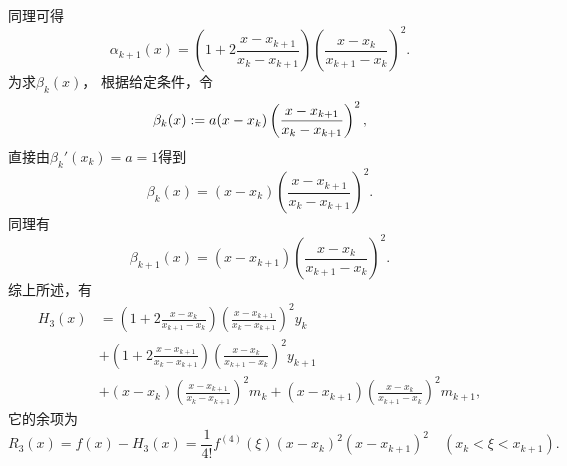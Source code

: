 同理可得\begin{equation*}
	\alpha_{k+1}(x)
	= \left( 1 + 2 \frac{x - x_{k+1}}{x_k - x_{k+1}} \right)
	\left( \frac{x - x_k}{x_{k+1} - x_k} \right)^2.
\end{equation*}
为求\(\beta_k(x)\)，
根据给定条件，令\begin{equation*}
	\beta_k(x)
	:=
	a (x-x_k)
	\left( \frac{x - x_{k+1}}{x_k - x_{k+1}} \right)^2,
\end{equation*}
直接由\(\beta_k'(x_k) = a = 1\)得到\begin{equation*}
	\beta_k(x)
	= (x-x_k)
	\left( \frac{x - x_{k+1}}{x_k - x_{k+1}} \right)^2.
\end{equation*}
同理有\begin{equation*}
	\beta_{k+1}(x)
	= (x-x_{k+1})
	\left( \frac{x - x_k}{x_{k+1} - x_k} \right)^2.
\end{equation*}
综上所述，有\begin{equation}\label{equation:厄米插值.两点三次厄米插值多项式}
	\begin{aligned}
		H_3(x)
		&= \left( 1 + 2 \frac{x - x_k}{x_{k+1} - x_k} \right)
		\left( \frac{x - x_{k+1}}{x_k - x_{k+1}} \right)^2
		y_k \\
		&+ \left( 1 + 2 \frac{x - x_{k+1}}{x_k - x_{k+1}} \right)
		\left( \frac{x - x_k}{x_{k+1} - x_k} \right)^2
		y_{k+1} \\
		&+ (x - x_k)
		\left( \frac{x - x_{k+1}}{x_k - x_{k+1}} \right)^2
		m_k
		+ (x - x_{k+1})
		\left( \frac{x - x_k}{x_{k+1} - x_k} \right)^2
		m_{k+1},
	\end{aligned}
\end{equation}
它的余项为\begin{equation}\label{equation:厄米插值.两点三次厄米插值余项}
	R_3(x) = f(x) - H_3(x)
	= \frac1{4!} f^{(4)}(\xi)
	(x - x_k)^2 (x - x_{k+1})^2
	\quad(x_k < \xi < x_{k+1}).
\end{equation}
